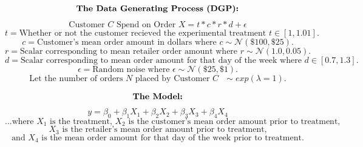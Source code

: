 \documentclass[12pt]{article}
\begin{document}
\[\text{\bf{The Data Generating Process (DGP):}}\]
\[\text{Customer $C$ Spend on Order $X$} = t*c*r*d + \epsilon \]
\[t = \text{Whether or not the customer recieved the experimental treatment } t \in [1,1.01].\]
\[c = \text{Customer's mean order amount in dollars where } c \sim \mathcal{N}(\$100,\$25).\]
\[r = \text{Scalar corresponding to mean retailer order amount where } r \sim \mathcal{N}(1.0,0.05).\]
\[d = \text{Scalar corresponding to mean order amount for that day of the week where } d \in [0.7,1.3].\]
\[\epsilon = \text{Random noise where } \epsilon \sim \mathcal{N}(\$25,\$1).\]
\[\text{Let the number of orders $N$ placed by Customer $C$ } \sim exp(\lambda = 1).\]

\[\text{\bf{The Model:}}\]
\[ y = \beta_0 + \beta_1X_1 + \beta_2X_2 + \beta_3X_3 + \beta_4X_4 \]
\[\text{...where $X_1$ is the treatment, $X_2$ is the customer's mean order amount prior to treatment,}\] 
\[\text{$X_3$ is the retailer's mean order amount prior to treatment,}\] 
\[\text{and $X_4$ is the mean order amount for that day of the week prior to treatment.}\]
\end{document}
